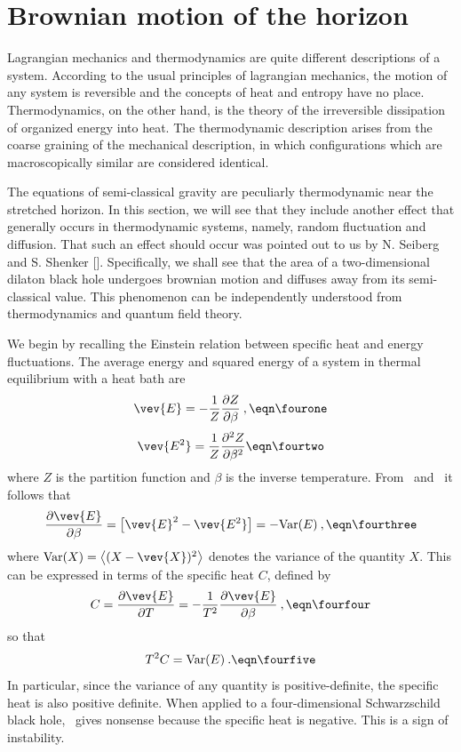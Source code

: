 %
%
\chapter{Brownian motion of the horizon}

Lagrangian mechanics and thermodynamics are quite different
descriptions of a system.  According to the usual principles of
lagrangian mechanics, the motion of any system is reversible and the
concepts of heat and entropy have no place.  Thermodynamics, on the
other hand, is the theory of the irreversible dissipation of
organized energy into heat.  The thermodynamic description arises
from the coarse graining of the mechanical description, in which
configurations which are macroscopically similar are considered
identical.

The equations of semi-classical gravity are peculiarly thermodynamic
near the stretched horizon.  In this section, we will see that they
include another effect that generally occurs in thermodynamic
systems, namely, random fluctuation and diffusion.  That such an
effect should occur was pointed out to us by N. Seiberg and S.
Shenker [\seishe].  Specifically, we shall see that the area of a
two-dimensional dilaton black hole undergoes brownian motion and
diffuses away from its semi-classical value.  This phenomenon can be
independently understood from thermodynamics and quantum field
theory.

We begin by recalling the Einstein relation between specific heat and
energy fluctuations.  The average energy and squared energy of a
system in thermal equilibrium with a heat bath are
$$
\vev{E} = - {1 \over Z} {\pa Z \over \pa \beta} \>,
\eqn\fourone
$$
$$
\vev{E^2} = {1 \over Z}{\pa^2 Z \over \pa \beta^2}
\eqn\fourtwo
$$
where $Z$ is the partition function and $\beta$ is the inverse
temperature.  From \fourone\ and \fourtwo\ it follows that
$$
{\pa \vev{E} \over \pa \beta} = \bigl[ \vev{E}^2
- \vev{E^2} \bigr] = -\Var(E) \>,
\eqn\fourthree
$$
where $\Var(X) = \big \langle (X - \vev{X})^2 \big \rangle$ denotes
the variance of the quantity $X$.  This can be expressed in terms of
the specific heat $C$, defined by
$$
C = {\pa \vev{E} \over \pa T} =
-{1 \over T^2} {\pa \vev{E} \over \pa \beta} \>,
\eqn\fourfour
$$
so that
$$
T^2 C = \hbox{Var}(E) \>.
\eqn\fourfive
$$
In particular, since the variance of any quantity is
positive-definite, the specific heat is also positive definite.  When
applied to a four-dimensional Schwarzschild black hole, \fourfour\
gives nonsense because the specific heat is negative.  This is a sign
of instability.

